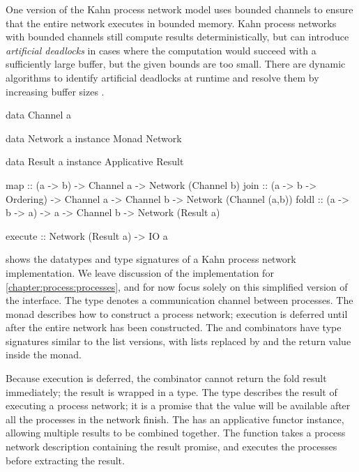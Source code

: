 One version of the Kahn process network model uses bounded channels to ensure that the entire network executes in bounded memory.
Kahn process networks with bounded channels still compute results deterministically, but can introduce \emph{artificial deadlocks} in cases where the computation would succeed with a sufficiently large buffer, but the given bounds are too small.
There are dynamic algorithms to identify artificial deadlocks at runtime and resolve them by increasing buffer sizes \cite{parks1995bounded,geilen2003requirements}.


\begin{haskell}[float,caption=Types and combinators for Kahn process networks,label=figs/kpn/combinators]
data Channel a

data Network a
instance Monad Network

data Result  a
instance Applicative Result

map     :: (a -> b) -> Channel a
        -> Network (Channel b)
join    :: (a -> b -> Ordering) -> Channel a -> Channel b
        -> Network (Channel (a,b))
foldl   :: (a -> b -> a) -> a -> Channel b
        -> Network (Result a)

execute :: Network (Result a) -> IO a
\end{haskell}

 shows the datatypes and type signatures of a Kahn process network implementation.
We leave discussion of the implementation for \cref{chapter:process:processes}, and for now focus solely on this simplified version of the interface.
The \Hs@Channel@ type denotes a communication channel between processes.
The \Hs@Network@ monad describes how to construct a process network; execution is deferred until after the entire network has been constructed.
The \Hs@map@ and \Hs@join@ combinators have type signatures similar to the list versions, with lists replaced by \Hs@Channel@s and the return value inside the \Hs@Network@ monad.

Because execution is deferred, the \Hs@foldl@ combinator cannot return the fold result immediately; the result is wrapped in a \Hs@Result@ type.
The \Hs@Result@ type describes the result of executing a process network; it is a promise that the value will be available after all the processes in the network finish.
The \Hs@Result@ has an applicative functor instance, allowing multiple results to be combined together.
The \Hs@execute@ function takes a process network description containing the result promise, and executes the processes before extracting the result.



